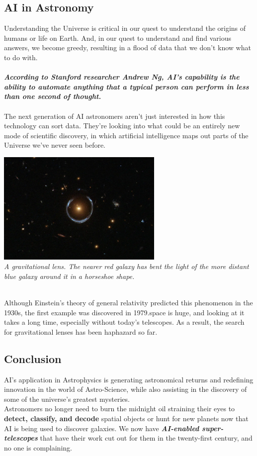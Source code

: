 \documentclass[12pt,letterpaper]{article}
\begin{document}
\subsection* {AI in Astronomy} 
Understanding the Universe is critical in our quest to understand the origins of humans or life on Earth. And, in our quest to understand and find various answers, we become greedy, resulting in a flood of data that we don't know what to do with.
\\
\\
\textbf{\textit{According to Stanford researcher Andrew Ng, AI's capability is the ability to automate anything that a typical person can perform in less than one second of thought.}}
\\
\\
The next generation of AI astronomers aren't just interested in how this technology can sort data. They're looking into what could be an entirely new mode of scientific discovery, in which artificial intelligence maps out parts of the Universe we've never seen before.
\begin{center}
\includegraphics[width=0.6\textwidth]{gravitational_lens.png}
\\
\textit{A gravitational lens. The nearer red galaxy has bent the light of the more distant blue galaxy around it in a horseshoe shape.}
\end{center}
\\
Although Einstein's theory of general relativity predicted this phenomenon in the 1930s, the first example was discovered in 1979.space is huge, and looking at it takes a long time, especially without today's telescopes. As a result, the search for gravitational lenses has been haphazard so far.
\subsection* {Conclusion}
AI's application in Astrophysics is generating astronomical returns and redefining innovation in the world of Astro-Science, while also assisting in the discovery of some of the universe's greatest mysteries.
\\
Astronomers no longer need to burn the midnight oil straining their eyes to \textbf{detect, classify, and decode} spatial objects or hunt for new planets now that AI is being used to discover galaxies. We now have \textbf{\textit{AI-enabled super-telescopes}} that have their work cut out for them in the twenty-first century, and no one is complaining.
\end{document}
